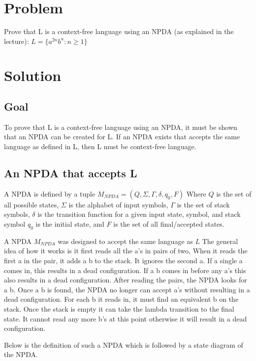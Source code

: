 \documentclass{assignment-x}
\begin{document}
\maketitle
\pagebreak

\section{Problem}
Prove that L is a context-free language using an NPDA (as explained in the lecture): 
$L=\{a^{2n}b^n: n \ge 1 \}$

\section{Solution}
\subsection{Goal}
To prove that L is a context-free language using an NPDA, it must be shown that an NPDA can be created for L.
If an NPDA exists that accepts the same language as defined in L, then L must be context-free language.

\subsection{An NPDA that accepts L}
A NPDA is defined by a tuple $M_{NPDA} = (Q,\Sigma,\Gamma,\delta,q_0,F)$
Where $Q$ is the set of all possible states, $\Sigma$ is the alphabet of input symbols, $\Gamma$ is the set of stack symbols, $\delta$ is the transition function for a given input state, symbol, and stack symbol $q_0$ is the initial state, and $F$ is the set of all final/accepted states.

A NPDA $M_{NPDA}$ was designed to accept the same language as $L$
The general idea of how it works is it first reads all the a's in pairs of two,
When it reads the first a in the pair, it adds a b to the stack.
It ignores the second a.
If a single a comes in, this results in a dead configuration.
If a b comes in before any a's this also results in a dead configuration.
After reading the pairs, the NPDA looks for a b.
Once a b is found, the NPDA no longer can accept a's without resulting in a dead configuration.
For each b it reads in, it must find an equivalent b on the stack.
Once the stack is empty it can take the lambda transition to the final state.
It cannot read any more b's at this point otherwise it will result in a dead configuration.

Below is the definition of such a NPDA which is followed by a state diagram of the NPDA.
\end{document}
